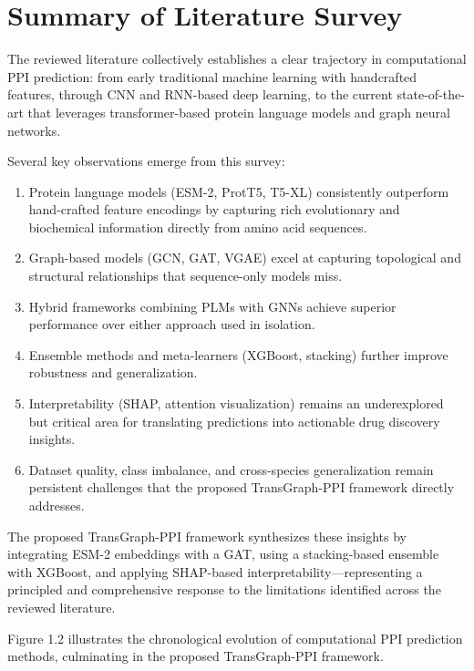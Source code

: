 \documentclass[12pt,a4paper]{report}
\begin{document}
\newpage

\section{Summary of Literature Survey}
The reviewed literature collectively establishes a clear trajectory in computational PPI prediction: from early traditional machine learning with handcrafted features, through CNN and RNN-based deep learning, to the current state-of-the-art that leverages transformer-based protein language models and graph neural networks.

Several key observations emerge from this survey:
\begin{enumerate}
    \item Protein language models (ESM-2, ProtT5, T5-XL) consistently outperform hand-crafted feature encodings by capturing rich evolutionary and biochemical information directly from amino acid sequences.
    \item Graph-based models (GCN, GAT, VGAE) excel at capturing topological and structural relationships that sequence-only models miss.
    \item Hybrid frameworks combining PLMs with GNNs achieve superior performance over either approach used in isolation.
    \item Ensemble methods and meta-learners (XGBoost, stacking) further improve robustness and generalization.
    \item Interpretability (SHAP, attention visualization) remains an underexplored but critical area for translating predictions into actionable drug discovery insights.
    \item Dataset quality, class imbalance, and cross-species generalization remain persistent challenges that the proposed TransGraph-PPI framework directly addresses.
\end{enumerate}

The proposed TransGraph-PPI framework synthesizes these insights by integrating ESM-2 embeddings with a GAT, using a stacking-based ensemble with XGBoost, and applying SHAP-based interpretability---representing a principled and comprehensive response to the limitations identified across the reviewed literature.

Figure 1.2 illustrates the chronological evolution of computational PPI prediction methods, culminating in the proposed TransGraph-PPI framework.
\end{document}
